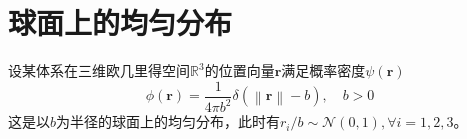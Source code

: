 \documentclass[main.tex]{subfiles}
\begin{document}
\section{球面上的均匀分布}
设某体系在三维欧几里得空间$\mathbb{R}^3$的位置向量$\mathbf{r}$满足概率密度$\psi\left(\mathbf{r}\right)$
\[\phi\left(\mathbf{r}\right)=\frac{1}{4\pi b^2}\delta\left(\left\|\mathbf{r}\right\|-b\right),\quad b>0\]
这是以$b$为半径的球面上的均匀分布，此时有$r_i/b\sim\mathcal{N}\left(0,1\right),\forall i=1,2,3$\cite{Muller1959}。
\end{document}
